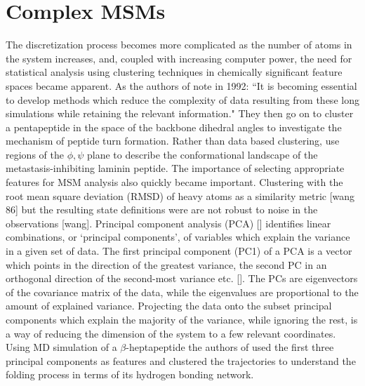 \section{Complex MSMs}
The discretization process becomes more complicated as the number of atoms in the system increases, and, coupled with increasing computer power, the need for statistical analysis using clustering techniques in chemically significant feature spaces became apparent. As the authors of \cite{karpen1993statistical} note in 1992: 
``It is becoming essential to develop methods which reduce the complexity of data resulting from these long simulations while retaining the relevant information."
They then go on to cluster a pentapeptide in the space of the backbone dihedral angles to investigate the mechanism of peptide turn formation. Rather than data based clustering, \cite{mckelveyCHARMMAnalysisConformations1991} use regions of the $\phi, \psi$ plane to describe the conformational landscape of the metastasis-inhibiting laminin peptide. The importance of selecting appropriate features for MSM analysis also quickly became important.  Clustering with the root mean square deviation (RMSD) of heavy atoms as a similarity metric [wang 86] but the resulting state definitions were are not robust to noise in the observations [wang].  
Principal component analysis (PCA) [] identifies linear combinations, or `principal components', of variables which explain the variance in a given set of data. The first principal component (PC1) of a PCA  is a vector which points in the direction of the greatest variance, the second PC in an orthogonal direction of the second-most variance etc. []. The PCs are eigenvectors of the covariance matrix of the data, while the eigenvalues are proportional to the amount of explained variance. Projecting the data onto the subset principal components which explain the majority of the variance, while ignoring the rest, is a way of reducing the dimension of the system to a few relevant coordinates. Using MD simulation of a $\beta$-heptapeptide the authors of \cite{degrootEssentialDynamicsReversible2001} used the first three principal components as features and clustered the trajectories to understand the folding process in terms of its hydrogen bonding network. 

